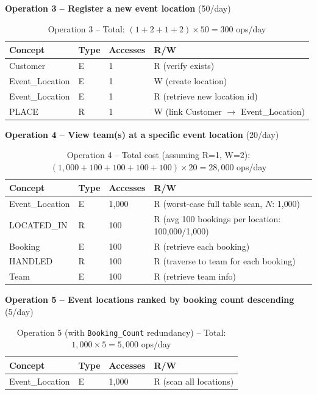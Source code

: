 \documentclass[12pt]{article}
\begin{document}
\pagebreak

\noindent\textbf{Operation 3 -- Register a new event location} (50/day)
\begin{table}[H]
  \renewcommand{\arraystretch}{1.3}
  \begin{tabularx}{\textwidth}{|X|X|X|X|}
  \hline \textbf{Concept} & \textbf{Type} & \textbf{Accesses} & \textbf{R/W} \\ \hline
  Customer        & E & 1 & R (verify exists) \\ \hline
  Event\_Location & E & 1 & W (create location) \\ \hline
  Event\_Location & E & 1 & R (retrieve new location id) \\ \hline
  PLACE           & R & 1 & W (link Customer $\to$ Event\_Location) \\ \hline
  \end{tabularx}
  \caption{Operation 3 -- Total: $(1+2+1+2) \times 50 = 300$ ops/day}
\end{table}

\noindent\textbf{Operation 4 -- View team(s) at a specific event location} (20/day)
\begin{table}[H]
  \renewcommand{\arraystretch}{1.3}
  \begin{tabularx}{\textwidth}{|X|X|X|X|}
  \hline \textbf{Concept} & \textbf{Type} & \textbf{Accesses} & \textbf{R/W} \\ \hline
  Event\_Location & E & 1{,}000 & R (worst-case full table scan, $N$: 1{,}000) \\ \hline
  LOCATED\_IN     & R & 100     & R (avg 100 bookings per location: 100{,}000/1{,}000) \\ \hline
  Booking         & E & 100     & R (retrieve each booking) \\ \hline
  HANDLED         & R & 100     & R (traverse to team for each booking) \\ \hline
  Team            & E & 100     & R (retrieve team info) \\ \hline
  \end{tabularx}
  \caption{Operation 4 -- Total cost (assuming R=1, W=2): $(1{,}000+100+100+100+100) \times 20 = 28{,}000$ ops/day}
\end{table}

\pagebreak

\noindent\textbf{Operation 5 -- Event locations ranked by booking count descending} (5/day)
\begin{table}[H]
  \renewcommand{\arraystretch}{1.3}
  \begin{tabularx}{\textwidth}{|X|X|X|X|}
  \hline \textbf{Concept} & \textbf{Type} & \textbf{Accesses} & \textbf{R/W} \\ \hline
  Event\_Location & E & 1{,}000 & R (scan all locations) \\ \hline
  \end{tabularx}
  \caption{Operation 5 (with \texttt{Booking\_Count} redundancy) -- Total: $1{,}000 \times 5 = 5{,}000$ ops/day}
\end{table}
\end{document}
